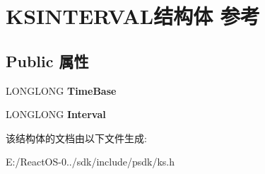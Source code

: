 \hypertarget{struct_k_s_i_n_t_e_r_v_a_l}{}\section{K\+S\+I\+N\+T\+E\+R\+V\+A\+L结构体 参考}
\label{struct_k_s_i_n_t_e_r_v_a_l}
\subsection*{Public 属性}
\begin{DoxyCompactItemize}
\item 
\mbox{\label{struct_k_s_i_n_t_e_r_v_a_l_a890f5ef2967056afb2a30db80b87e4e2}} 
L\+O\+N\+G\+L\+O\+NG {\bfseries Time\+Base}
\item 
\mbox{\label{struct_k_s_i_n_t_e_r_v_a_l_aa5e6d780b5d8cbf63c7092ef0130c27f}} 
L\+O\+N\+G\+L\+O\+NG {\bfseries Interval}
\end{DoxyCompactItemize}


该结构体的文档由以下文件生成\+:\begin{DoxyCompactItemize}
\item 
E\+:/\+React\+O\+S-\/0../sdk/include/psdk/ks.\+h\end{DoxyCompactItemize}
